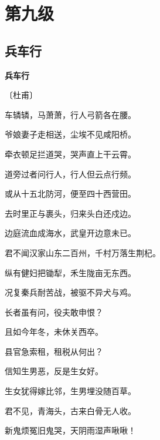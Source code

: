 \documentclass[12pt,UTF-8,openany,fontset=none]{ctexbook}
\begin{document}
\vspace{8pt}
\clearpage

\chapter{第九级}
\clearpage

\section{兵车行}


\begin{center}
    {\bfseries 兵车行}

    \vspace{18pt}

    \begin{large}\xuwen
        〔杜甫〕
    \end{large}

\end{center}

    \vspace{18pt}  %

\begin{center}
    \begin{Large}

        车辚辚，马萧萧，行人弓箭各在腰。

        爷娘妻子走相送，尘埃不见咸阳桥。

        牵衣顿足拦道哭，哭声直上干云霄。

        道旁过者问行人，行人但云点行频。

        或从十五北防河，便至四十西营田。

        去时里正与裹头，归来头白还戍边。

        边庭流血成海水，武皇开边意未已。

        君不闻汉家山东二百州，千村万落生荆杞。\hspace{40pt}

        纵有健妇把锄犁，禾生陇亩无东西。

        况复秦兵耐苦战，被驱不异犬与鸡。

        长者虽有问，役夫敢申恨？

        且如今年冬，未休关西卒。

        县官急索租，租税从何出？

        信知生男恶，反是生女好。

        生女犹得嫁比邻，生男埋没随百草。

        君不见，青海头，古来白骨无人收。

        新鬼烦冤旧鬼哭，天阴雨湿声啾啾！

    \end{Large}

\end{center}
\end{document}
